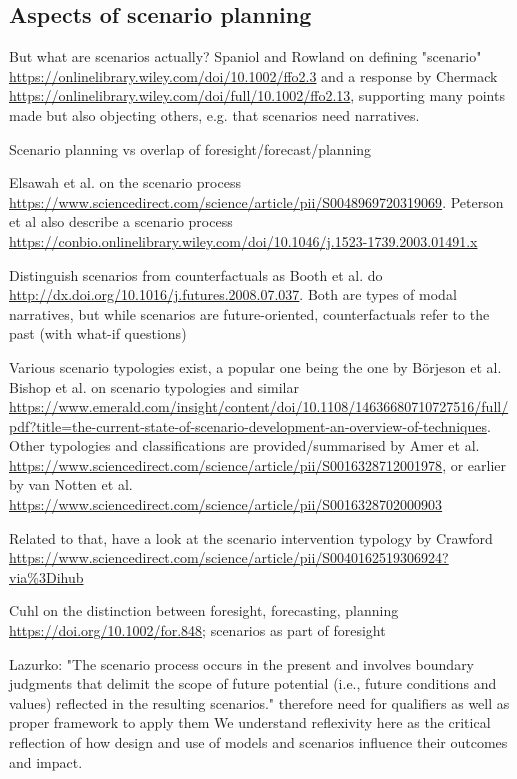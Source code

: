\documentclass{article}
\begin{document}
\begin{refsection}
\subsection{Aspects of scenario planning}

But what are scenarios actually? 
Spaniol and Rowland on defining "scenario" \url{https://onlinelibrary.wiley.com/doi/10.1002/ffo2.3} and a response by Chermack \url{https://onlinelibrary.wiley.com/doi/full/10.1002/ffo2.13}, supporting many points made but also objecting others, e.g. that scenarios need narratives.

Scenario planning vs overlap of foresight/forecast/planning

Elsawah et al. on the scenario process \url{https://www.sciencedirect.com/science/article/pii/S0048969720319069}. Peterson et al also describe a scenario process \url{https://conbio.onlinelibrary.wiley.com/doi/10.1046/j.1523-1739.2003.01491.x}

Distinguish scenarios from counterfactuals as Booth et al. do \url{http://dx.doi.org/10.1016/j.futures.2008.07.037}. Both are types of modal narratives, but while scenarios are future-oriented, counterfactuals refer to the past (with what-if questions)

Various scenario typologies exist, a popular one being the one by Börjeson et al. Bishop et al. on scenario typologies and similar \url{https://www.emerald.com/insight/content/doi/10.1108/14636680710727516/full/pdf?title=the-current-state-of-scenario-development-an-overview-of-techniques}. Other typologies and classifications are provided/summarised by Amer et al. \url{https://www.sciencedirect.com/science/article/pii/S0016328712001978}, or earlier by van Notten et al. \url{https://www.sciencedirect.com/science/article/pii/S0016328702000903}

Related to that, have a look at the scenario intervention typology by Crawford \url{https://www.sciencedirect.com/science/article/pii/S0040162519306924?via%3Dihub}

Cuhl on the distinction between foresight, forecasting, planning \url{https://doi.org/10.1002/for.848}; scenarios as part of foresight

Lazurko: "The scenario process occurs in the present
and involves boundary judgments that delimit the scope of future
potential (i.e., future conditions and values) reflected in the resulting
scenarios." therefore need for qualifiers as well as proper framework to apply them
We understand reflexivity here as the critical reflection of how design and use of models and scenarios influence their outcomes and impact.


\end{refsection}
\end{document}

